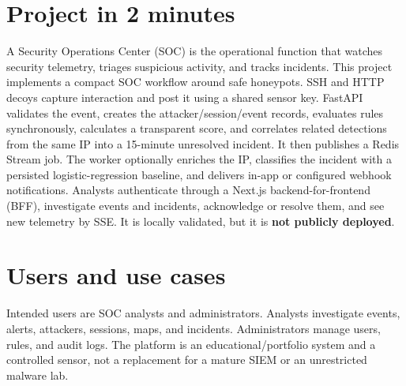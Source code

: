 \documentclass[11pt,oneside]{book}
\begin{document}
\section*{Project in 2 minutes}A Security Operations Center (SOC) is the operational function that watches security telemetry, triages suspicious activity, and tracks incidents. This project implements a compact SOC workflow around safe honeypots. SSH and HTTP decoys capture interaction and post it using a shared sensor key. FastAPI validates the event, creates the attacker/session/event records, evaluates rules synchronously, calculates a transparent score, and correlates related detections from the same IP into a 15-minute unresolved incident. It then publishes a Redis Stream job. The worker optionally enriches the IP, classifies the incident with a persisted logistic-regression baseline, and delivers in-app or configured webhook notifications. Analysts authenticate through a Next.js backend-for-frontend (BFF), investigate events and incidents, acknowledge or resolve them, and see new telemetry by SSE. It is locally validated, but it is \textbf{not publicly deployed}.
\section{Users and use cases}Intended users are SOC analysts and administrators. Analysts investigate events, alerts, attackers, sessions, maps, and incidents. Administrators manage users, rules, and audit logs. The platform is an educational/portfolio system and a controlled sensor, not a replacement for a mature SIEM or an unrestricted malware lab.
\end{document}
